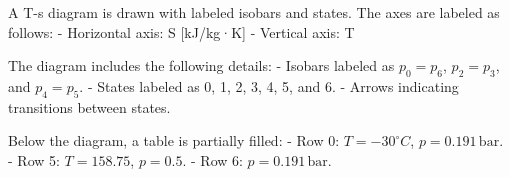 A T-s diagram is drawn with labeled isobars and states. The axes are labeled as follows:  
- Horizontal axis: S [kJ/kg·K]  
- Vertical axis: T  

The diagram includes the following details:  
- Isobars labeled as \( p_0 = p_6 \), \( p_2 = p_3 \), and \( p_4 = p_5 \).  
- States labeled as 0, 1, 2, 3, 4, 5, and 6.  
- Arrows indicating transitions between states.  

Below the diagram, a table is partially filled:  
- Row 0: \( T = -30^\circ C \), \( p = 0.191 \, \text{bar} \).  
- Row 5: \( T = 158.75 \), \( p = 0.5 \).  
- Row 6: \( p = 0.191 \, \text{bar} \).